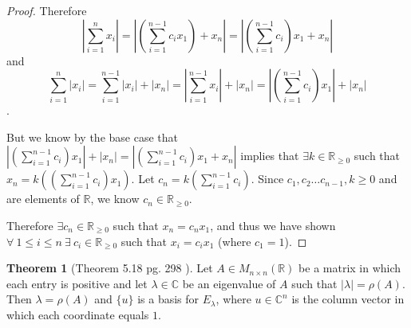 \documentclass{amsart}
\theoremstyle{definition}
\newtheorem{theorem}{Theorem}
\theoremstyle{remark}
\numberwithin{equation}{section}
\begin{document}
\begin{proof}
Therefore
$$|\sum_{i = 1}^{n} x_i| = |(\sum_{i = 1}^{n-1} c_ix_1) + x_n| = |(\sum_{i = 1}^{n-1} c_i)x_1 + x_n|$$
and
$$\sum_{i = 1}^{n}| x_i| = \sum_{i = 1}^{n-1}| x_i| + |x_n| = |\sum_{i = 1}^{n-1} x_i| + |x_n| = |(\sum_{i = 1}^{n-1}c_i )x_1| + |x_n| $$.

But we know by the base case that
$|(\sum_{i = 1}^{n-1}c_i )x_1| + |x_n| = |(\sum_{i = 1}^{n-1} c_i)x_1 + x_n|$
implies that $\exists k \in \mathbb{R}_{\geq 0}$ such that $x_n = k((\sum_{i = 1}^{n-1} c_i)x_1)$.
Let $c_n = k(\sum_{i = 1}^{n-1} c_i)$.
Since $c_1, c_2 \ldots c_{n-1}, k \geq 0$ and are elements of $\mathbb{R}$, we know $c_n \in \mathbb{R}_{\geq 0}$.

Therefore $\exists c_n \in \mathbb{R}_{\geq 0}$ such that $x_n = c_n
x_1$, and thus we have shown $\forall\ 1 \leq i \leq n\ \exists\ c_i
\in \mathbb{R}_{\geq 0}$ such that $x_i = c_ix_1$ (where $c_1 = 1$).


\end{proof}

\newpage

\begin{theorem}[Theorem 5.18 pg. 298 \cite{friedberg2003linear}]\label{theorem518}
Let $A \in M_{n \times n} (\mathbb{R})$ be a matrix in which each
entry is positive and let $\lambda \in \mathbb{C}$ be an eigenvalue
of $A$ such that $| \lambda | = \rho(A)$. Then $\lambda = \rho(A)$
and $\{ u \}$ is a basis for $E_{\lambda}$, where $u \in
\mathbb{C}^n$ is the column vector in which each coordinate equals
$1$.

\end{theorem}
\end{document}
